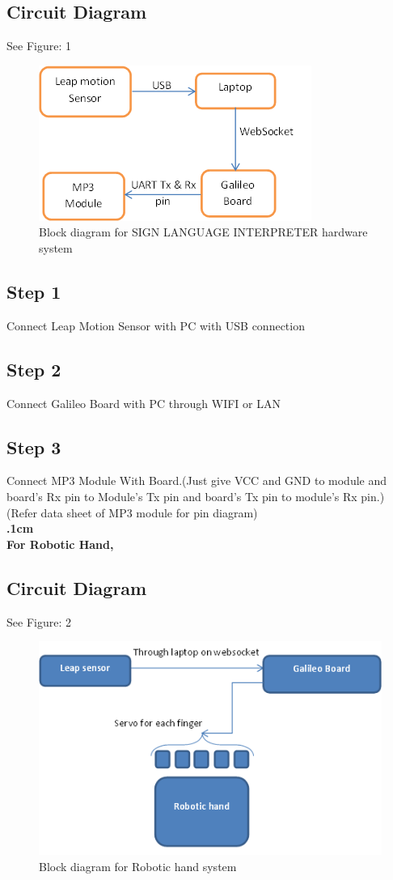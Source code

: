 \documentclass[a4paper,12pt,oneside]{book}
\begin{document}
\subsection*{Circuit Diagram}
See Figure: 1
\begin{figure}
  \includegraphics[width=\linewidth]{1.png}
  \caption{Block diagram for SIGN LANGUAGE INTERPRETER hardware system}
\end{figure}
\subsection*{Step 1}
Connect Leap Motion Sensor with PC with USB connection
\subsection*{Step 2}
Connect Galileo Board with PC through WIFI or LAN
\subsection*{Step 3}
Connect MP3 Module With Board.(Just give VCC and GND to module and board's Rx pin to Module's Tx pin and board's Tx pin to module's Rx pin.)(Refer data sheet of MP3 module for pin diagram)\\
\textbf{.1cm}\\
\textbf{For Robotic Hand,}
\subsection*{Circuit Diagram}
See Figure: 2
\begin{figure}
  \includegraphics[width=\linewidth]{2.png}
  \caption{Block diagram for Robotic hand system}
\end{figure}
\end{document}
